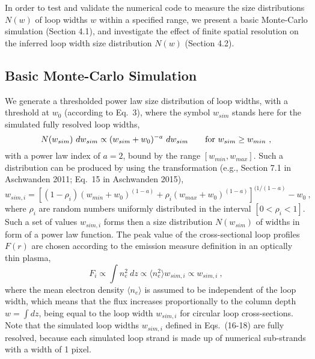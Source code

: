 \documentclass[10pt,preprint]{aastex}  %
\begin{document}
In order to test and validate the numerical code to measure the size
distributions $N(w)$ of loop widths $w$ within a specified range,
we present a basic Monte-Carlo simulation (Section 4.1), and
investigate the effect of finite spatial resolution on the 
inferred loop width size distribution $N(w)$ (Section 4.2).  

\subsection{	Basic Monte-Carlo Simulation		}

We generate a thresholded power law size distribution of loop widths,
with a threshold at $w_0$ (according to Eq.~3), where the symbol
$w_{sim}$ stands here for the simulated fully resolved loop widths,
\begin{equation}
	N(w_{sim}) \ dw_{sim} \propto (w_{sim} + w_0)^{-a} \ dw_{sim} 
	\qquad {\rm for}\ w_{sim} \ge w_{min} \ ,
\end{equation}
with a power law index of $a=2$, bound by the range 
$[w_{min},w_{max}]$. Such a distribution can be produced by using 
the transformation (e.g., Section 7.1 in Aschwanden 2011;
Eq.~15 in Aschwanden 2015),
\begin{equation}
	w_{sim,i} = \left[(1 - \rho_i)(w_{min}+w_0)^{(1-a)}
	+ \rho_i (w_{max} + w_0)^{(1-a)} \right]^{(1/(1-a)} - w_0 \ ,
\end{equation}
where $\rho_i$ are random numbers uniformly distributed
in the interval $[0 < \rho_i < 1]$. Such a set of values $w_{sim,i}$
forms then a size distribution $N(w_{sim})$ of widths in form of a 
power law function. The peak value of the cross-sectional 
loop profiles $F(r)$ are chosen according to the
emission measure definition in an optically thin plasma,
\begin{equation}
	F_i \propto \int n_e^2\ dz \propto \langle n_e^2 \rangle w_{sim,i} 
	\propto w_{sim,i} \ ,
\end{equation}
where the mean electron density $\langle n_e \rangle$
is assumed to be independent of the
loop width, which means that the flux increases proportionally
to the column depth $w = \int dz$, being equal to the loop width $w_{sim,i}$
for circular loop cross-sections. Note that the simulated loop widths
$w_{sim,i}$ defined in Eqs.~(16-18) are fully resolved, because each
simulated loop strand is made up of numerical sub-strands with a width
of 1 pixel.
\end{document}
